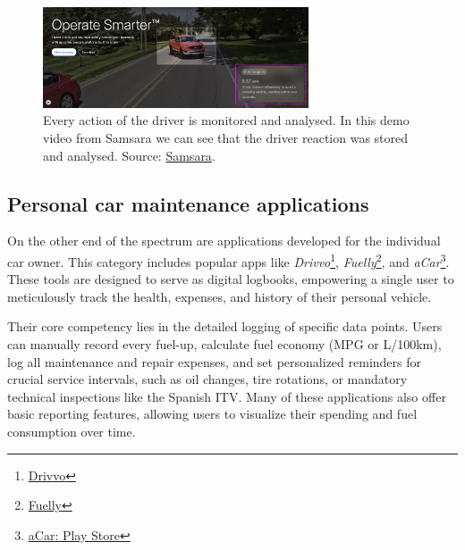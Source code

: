 \begin{itemize}
    \begin{figure}[H]
        \centering
        \includegraphics[width=0.7\textwidth]{images/background/samsara-privacy-issue.png}
        \caption{Every action of the driver is monitored and analysed. In this demo video from Samsara we can see that the driver reaction was stored and analysed. Source: \href{https://www.samsara.com/}{Samsara}.}
    \end{figure}

\end{itemize}

\subsection{Personal car maintenance applications}
On the other end of the spectrum are applications developed for the individual car owner. This category includes popular apps like \textit{Drivvo}\footnote{\href{https://www.drivvo.com/en}{Drivvo}}, \textit{Fuelly}\footnote{\href{https://www.fuelly.com/}{Fuelly}}, and \textit{aCar}\footnote{\href{https://play.google.com/store/apps/details?id=com.zonewalker.acar&pcampaignid=web_share}{aCar: Play Store}}. These tools are designed to serve as digital logbooks, empowering a single user to meticulously track the health, expenses, and history of their personal vehicle.

\textgap

Their core competency lies in the detailed logging of specific data points. Users can manually record every fuel-up, calculate fuel economy (MPG or L/100km), log all maintenance and repair expenses, and set personalized reminders for crucial service intervals, such as oil changes, tire rotations, or mandatory technical inspections like the Spanish ITV. Many of these applications also offer basic reporting features, allowing users to visualize their spending and fuel consumption over time.

